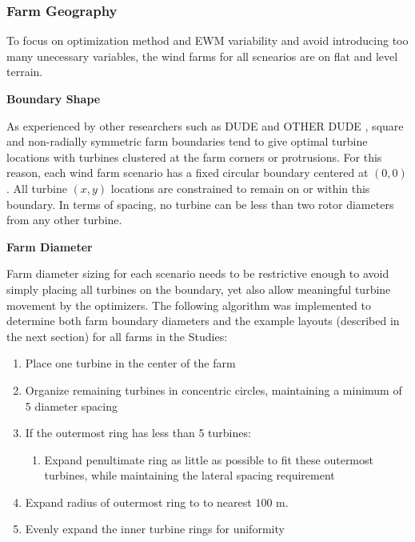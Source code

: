 \subsubsection{Farm Geography}
	To focus on optimization method and EWM variability and avoid introducing too many unecessary variables, the wind farms for all scnearios are on flat and level terrain.

\vspace{3mm}
\noindent\textbf{Boundary Shape}

	\noindent As experienced by other researchers such as DUDE \cite{} and OTHER DUDE \cite{}, square and non-radially symmetric farm boundaries tend to give optimal turbine locations with turbines clustered at the farm corners or protrusions.
	For this reason, each wind farm scenario has a fixed circular boundary centered at $(0, 0)$.
	All turbine $(x, y)$ locations are constrained to remain on or within this boundary.
	In terms of spacing, no turbine can be less than two rotor diameters from any other turbine.

\vspace{3mm}
\noindent\textbf{Farm Diameter}

	\noindent Farm diameter sizing for each scenario needs to be restrictive enough to avoid simply placing all turbines on the boundary, yet also allow meaningful turbine movement by the optimizers.
	The following algorithm was implemented to determine both farm boundary diameters and the example layouts (described in the next section) for all farms in the Studies:

    \begin{enumerate}
        \item Place one turbine in the center of the farm
        \item Organize remaining turbines in concentric circles, maintaining a minimum of 5 diameter spacing
        \item If the outermost ring has less than 5 turbines:
        \begin{enumerate}
            \item Expand penultimate ring as little as possible to fit these outermost turbines, while maintaining the lateral spacing requirement
        \end{enumerate}
        \item Expand radius of outermost ring to to nearest $100$ m.
        \item Evenly expand the inner turbine rings for uniformity
    \end{enumerate}

